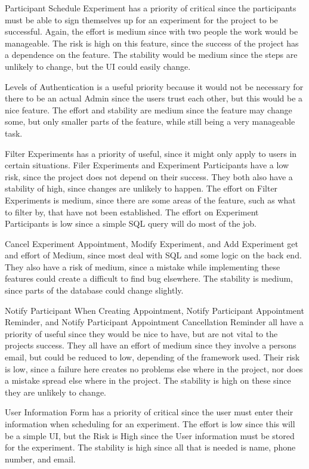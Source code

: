 Participant Schedule Experiment has a priority of critical since the participants must be able to sign themselves up for an experiment for the project to be successful.  Again, the effort is medium since with two people the work would be manageable.  The risk is high on this feature, since the success of the project has a dependence on the feature.  The stability would be medium since the steps are unlikely to change, but the UI could easily change.

Levels of Authentication is a useful priority because it would not be necessary for there to be an actual Admin since the users trust each other, but this would be a nice feature.  The effort and stability are medium since the feature may change some, but only smaller parts of the feature, while still being a very manageable task.

Filter Experiments has a priority of useful, since it might only apply to users in certain situations.  Filer Experiments and Experiment Participants have a low risk, since the project does not depend on their success.  They both also have a stability of high, since changes are unlikely to happen.  The effort on Filter Experiments is medium, since there are some areas of the feature, such as what to filter by, that have not been established.  The  effort on Experiment Participants is low since a simple SQL query will do most of the job.

Cancel Experiment Appointment, Modify Experiment, and Add Experiment get and effort of Medium, since most deal with SQL and some logic on the back end.  They also have a risk of medium, since a mistake while implementing these features could create a difficult to find bug elsewhere.  The stability is medium, since parts of the database could change slightly.

Notify Participant When Creating Appointment, Notify Participant Appointment Reminder, and Notify Participant Appointment Cancellation Reminder all have a priority of useful since they would be nice to have, but are not vital to the projects success.  They all have an effort of medium since they involve a persons email, but could be reduced to low, depending of the framework used.  Their risk is low, since a failure here creates no problems else where in the project, nor does a mistake spread else where in the project.  The stability is high on these since they are unlikely to change.

User Information Form has a priority of critical since the user must enter their information when scheduling for an experiment.  The effort is low since this will be a simple UI, but the Risk is High since the User information must be stored for the experiment.  The stability is high since all that is needed is name, phone number, and email.  


